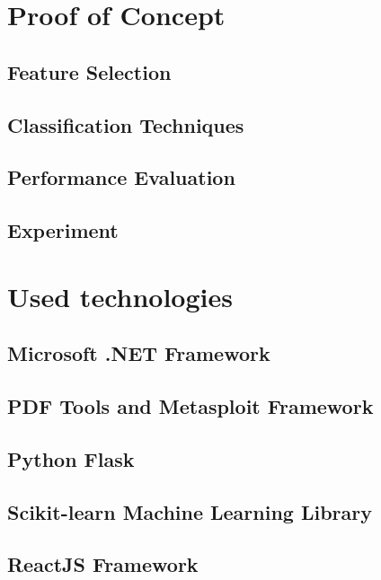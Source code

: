\section{Proof of Concept}
\label{section:poc}
\subsection{Feature Selection}
\subsection{Classification Techniques}
\subsection{Performance Evaluation}
\subsection{Experiment}     %

\section{Used technologies}
\label{section:technologies}
\subsection{Microsoft .NET Framework}
\subsection{PDF Tools and Metasploit Framework}
\cite{zeltser}
\subsection{Python Flask}
\subsection{Scikit-learn Machine Learning Library}
\cite{mlCookbook} 
\subsection{ReactJS Framework}
